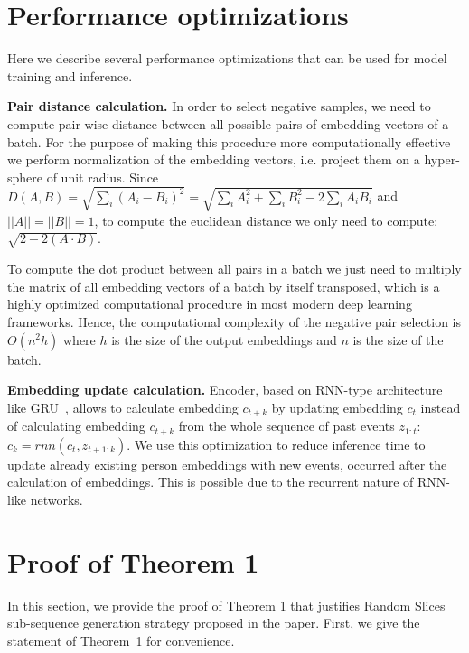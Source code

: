 \documentclass{article}
\begin{document}
\section{Performance optimizations} \label{app-sec-perf-opt}

Here we describe several performance optimizations that can be used for model training and inference.

\textbf{Pair distance calculation.} In order to select negative samples, we need to compute pair-wise distance between all possible pairs of embedding vectors of a batch. For the purpose of making this procedure more computationally effective we perform normalization of the embedding vectors, i.e. project them on a hyper-sphere of unit radius. Since $D(A,B) = \sqrt{\sum_i(A_i - B_i)^2} = \sqrt{\sum_i A_i^2 + \sum_i B_i^2 - 2\sum_i A_i B_i} $ and $||A||= ||B||=1$, to compute the euclidean distance we only need to compute: $\sqrt{2 - 2(A \cdot B)}$.

To compute the dot product between all pairs in a batch we just need to multiply the matrix of all embedding vectors of a batch by itself transposed, which is a highly optimized computational procedure in most modern deep learning frameworks. Hence, the computational complexity of the negative pair selection is $O(n^2h)$ where $h$ is the size of the output embeddings and $n$ is the size of the batch.

\textbf{Embedding update calculation.} Encoder, based on RNN-type architecture like GRU~\cite{Cho2014LearningPR}, allows to calculate embedding $c_{t+k}$ by updating embedding $c_t$ instead of  calculating embedding $c_{t+k}$ from the whole sequence of past events $z_{1:t}$: $c_k = rnn(c_t, z_{t+1:k})$. We use this optimization to reduce inference time to update already existing person embeddings with new events, occurred after the calculation of embeddings. This is possible due to the recurrent nature of RNN-like networks.

\section{Proof of Theorem 1} \label{app-sec-proof}

In this section, we provide the proof of Theorem 1 that justifies Random Slices sub-sequence generation strategy proposed in the paper. First, we give the statement of Theorem~1 for convenience.
\end{document}

